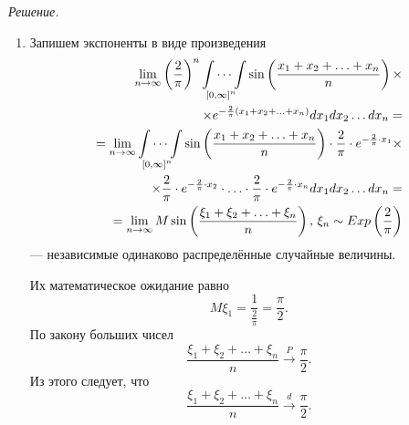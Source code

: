 \textit{Решение.}
\begin{enumerate}[label=\alph*)]
\item Запишем экспоненты в виде произведения
\begin{equation*}
\begin{split}
\lim \limits_{n \to \infty } \left( \frac{2}{ \pi } \right)^n
\idotsint \limits_{ \left[ 0, \infty \right]^n}
\sin \left( \frac{x_1 + x_2 + \dotsc + x_n}{n} \right) \times \\
\times e^{- \frac{2}{ \pi } \left( x_1 + x_2 + \dotsc + x_n \right) }
dx_1 dx_2 \dotsc dx_n = \\
= \lim \limits_{n \to \infty } \idotsint \limits_{ \left[ 0, \infty \right]^n}
\sin \left( \frac{x_1 + x_2 + \dotsc + x_n}{n} \right) \cdot
\frac{2}{ \pi } \cdot e^{- \frac{2}{ \pi } \cdot x_1} \times \\
\times \frac{2}{ \pi } \cdot e^{- \frac{2}{ \pi } \cdot x_2} \cdot \dotsc \cdot
\frac{2}{ \pi } \cdot e^{- \frac{2}{ \pi } \cdot x_n} dx_1 dx_2 \dotsc dx_n = \\
= \lim \limits_{n \to \infty } M \sin \left( \frac{ \xi_1 + \xi_2 + \dotsc + \xi_n}{n} \right), \,
\xi_n \sim Exp \left( \frac{2}{ \pi } \right)
\end{split}
\end{equation*}
--- независимые одинаково распределённые случайные величины.

Их математическое ожидание равно
$$M \xi_1 =
\frac{1}{ \frac{2}{ \pi }} =
\frac{ \pi }{2}.$$
По закону больших чисел
$$ \frac{ \xi_1 + \xi_2 + \dotsc + \xi_n}{n} \overset{P}{ \rightarrow } \frac{ \pi }{2}.$$
Из этого следует, что
$$ \frac{ \xi_1 + \xi_2 + \dotsc + \xi_n}{n} \overset{d}{ \rightarrow } \frac{ \pi }{2}.$$


\end{enumerate}
